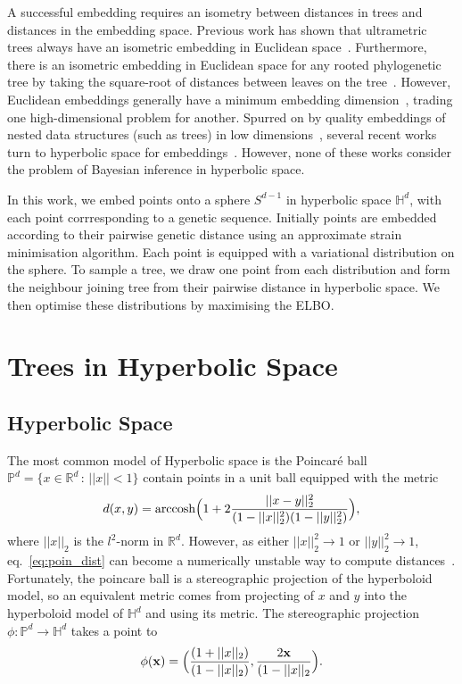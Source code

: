 \documentclass[11pt, twocolumn]{article}
\begin{document}
A successful embedding requires an isometry between distances in trees and distances in the embedding space. 
Previous work has shown that ultrametric trees always have an isometric embedding in Euclidean space~\cite{pavoine2005measuring}.
Furthermore, there is an isometric embedding in Euclidean space for any rooted phylogenetic tree by taking the square-root of distances between leaves on the tree~\cite{devienne2011euclidean}.
However, Euclidean embeddings generally have a minimum embedding dimension~\cite{deza1997geometry}, trading one high-dimensional problem for another.
Spurred on by quality embeddings of nested data structures (such as trees) in low dimensions~\cite{sala2018representation}, several recent works turn to hyperbolic space for embeddings~\cite{chami2020trees, wilson2021learning, matsumoto2020novel, lee2021deep}.
However, none of these works consider the problem of Bayesian inference in hyperbolic space.

In this work, we embed points onto a sphere $S^{d-1}$ in hyperbolic space $\mathbb{H}^d$, with each point corrresponding to a genetic sequence.
Initially points are embedded according to their pairwise genetic distance using an approximate strain minimisation algorithm.
Each point is equipped with a variational distribution on the sphere.
To sample a tree, we draw one point from each distribution and form the neighbour joining tree from their pairwise distance in hyperbolic space.
We then optimise these distributions by maximising the ELBO.


\section{Trees in Hyperbolic Space}
\subsection{Hyperbolic Space}
The most common model of Hyperbolic space is the Poincaré ball $\mathbb{P}^{d} = \{x\in \mathbb{R}^{d} \,:\, ||x||<1\}$ contain points in a unit ball equipped with the metric
\begin{equation*}\label{eq:poin_dist}
    d(x,y) = \textnormal{arccosh}\Big(1 + 2 \frac{||x-y||_{2}^{2}}{ (1-||x||_{2}^{2}) (1-||y||_{2}^{2})}\Big),
\end{equation*}
where $||x||_{2}$ is the $l^{2}$-norm in $\mathbb{R}^{d}$.
However, as either $||x||_{2}^{2}\to 1$ or $||y||_{2}^{2} \to 1$, eq.~\ref{eq:poin_dist} can become a numerically unstable way to compute distances~\cite{sala2018representation}.
Fortunately, the poincare ball is a stereographic projection of the hyperboloid model, so an equivalent metric comes from projecting of $x$ and $y$ into the hyperboloid model of $\mathbb{H}^{d}$ and using its metric.
The stereographic projection $\phi:\mathbb{P}^{d} \to \mathbb{H}^{d}$ takes a point to
\begin{equation}
    \phi(\bold{x}) = \Big(\frac{(1+||x||_{2})}{(1-||x||_{2})}, \frac{2 \bold{x}}{(1- ||x||_{2}}\Big).    
\end{equation}
\end{document}
